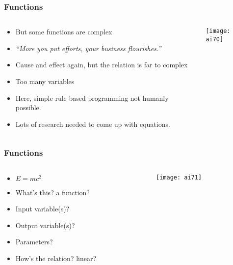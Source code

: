 \begin{frame}[fragile]\frametitle{Functions}

\begin{columns}
    \begin{column}[T]{0.6\linewidth}

\begin{itemize}
\item But some functions are complex
\item {\em ``More you put efforts, your business flourishes.''}
\item Cause and effect again, but the relation is far to complex
\item Too many variables
\item Here, simple rule based programming not humanly possible.
\item Lots of research needed to come up with equations.
\end{itemize}

    \end{column}
    \begin{column}[T]{0.4\linewidth}

			\begin{center}
			\texttt{[image: ai70]}
			\end{center}
			
    \end{column}
  \end{columns}
  
  

\end{frame}

\begin{frame}[fragile]\frametitle{Functions}

\begin{columns}
    \begin{column}[T]{0.6\linewidth}

\begin{itemize}
\item $E = mc^2$
\item What's this? a function?
\item Input variable(s)?
\item Output variable(s)?
\item Parameters?
\item How's the relation? linear?
\end{itemize}

    \end{column}
    \begin{column}[T]{0.4\linewidth}

			\begin{center}
			\texttt{[image: ai71]}
			\end{center}
			
    \end{column}
  \end{columns}
  

\end{frame}

